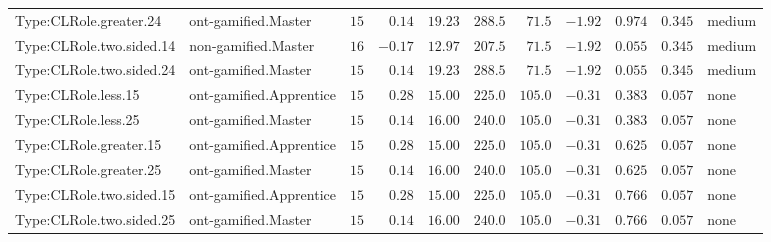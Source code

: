 \documentclass[6pt,a4paper]{article}
\begin{document}
{\begin{longtable}{llrrrrrrrrl}
Type:CLRole.greater.24&ont-gamified.Master&$15$&$ 0.14$&$19.23$&$ 288.5$&$ 71.5$&$-1.92$&$0.974$&$0.345$&medium\tabularnewline
Type:CLRole.two.sided.14&non-gamified.Master&$16$&$-0.17$&$12.97$&$ 207.5$&$ 71.5$&$-1.92$&$0.055$&$0.345$&medium\tabularnewline
Type:CLRole.two.sided.24&ont-gamified.Master&$15$&$ 0.14$&$19.23$&$ 288.5$&$ 71.5$&$-1.92$&$0.055$&$0.345$&medium\tabularnewline
Type:CLRole.less.15&ont-gamified.Apprentice&$15$&$ 0.28$&$15.00$&$ 225.0$&$105.0$&$-0.31$&$0.383$&$0.057$&none\tabularnewline
Type:CLRole.less.25&ont-gamified.Master&$15$&$ 0.14$&$16.00$&$ 240.0$&$105.0$&$-0.31$&$0.383$&$0.057$&none\tabularnewline
Type:CLRole.greater.15&ont-gamified.Apprentice&$15$&$ 0.28$&$15.00$&$ 225.0$&$105.0$&$-0.31$&$0.625$&$0.057$&none\tabularnewline
Type:CLRole.greater.25&ont-gamified.Master&$15$&$ 0.14$&$16.00$&$ 240.0$&$105.0$&$-0.31$&$0.625$&$0.057$&none\tabularnewline
\newpage
Type:CLRole.two.sided.15&ont-gamified.Apprentice&$15$&$ 0.28$&$15.00$&$ 225.0$&$105.0$&$-0.31$&$0.766$&$0.057$&none\tabularnewline
Type:CLRole.two.sided.25&ont-gamified.Master&$15$&$ 0.14$&$16.00$&$ 240.0$&$105.0$&$-0.31$&$0.766$&$0.057$&none\tabularnewline
\hline
\end{longtable}}
\end{document}
